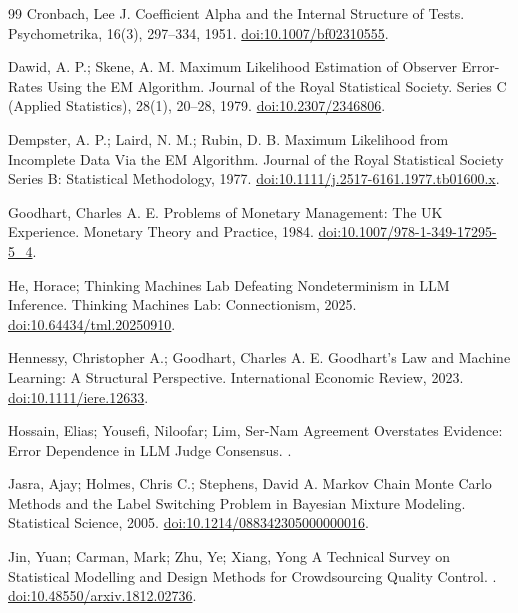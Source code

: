 \begin{thebibliography}{99}
Cronbach, Lee J.
\newblock Coefficient {Alpha} and the Internal Structure of Tests.
\newblock Psychometrika, 16(3), 297--334, 1951. \href{https://doi.org/10.1007/bf02310555}{doi:10.1007/bf02310555}.

Dawid, A. P.; Skene, A. M.
\newblock Maximum Likelihood Estimation of Observer Error-Rates Using the {EM} Algorithm.
\newblock Journal of the Royal Statistical Society. Series C (Applied Statistics), 28(1), 20--28, 1979. \href{https://doi.org/10.2307/2346806}{doi:10.2307/2346806}.

Dempster, A. P.; Laird, N. M.; Rubin, D. B.
\newblock Maximum Likelihood from Incomplete Data Via the {EM} Algorithm.
\newblock Journal of the Royal Statistical Society Series B: Statistical Methodology, 1977. \href{https://doi.org/10.1111/j.2517-6161.1977.tb01600.x}{doi:10.1111/j.2517-6161.1977.tb01600.x}.

Goodhart, Charles A. E.
\newblock Problems of Monetary Management: The {UK} Experience.
\newblock Monetary Theory and Practice, 1984. \href{https://doi.org/10.1007/978-1-349-17295-5\_4}{doi:10.1007/978-1-349-17295-5\_4}.

He, Horace; Thinking Machines Lab
\newblock Defeating Nondeterminism in {LLM} Inference.
\newblock Thinking Machines Lab: Connectionism, 2025. \href{https://doi.org/10.64434/tml.20250910}{doi:10.64434/tml.20250910}.

Hennessy, Christopher A.; Goodhart, Charles A. E.
\newblock Goodhart's Law and Machine Learning: A Structural Perspective.
\newblock International Economic Review, 2023. \href{https://doi.org/10.1111/iere.12633}{doi:10.1111/iere.12633}.

Hossain, Elias; Yousefi, Niloofar; Lim, Ser-Nam
\newblock Agreement Overstates Evidence: Error Dependence in {LLM} Judge Consensus.
.

Jasra, Ajay; Holmes, Chris C.; Stephens, David A.
\newblock Markov Chain Monte Carlo Methods and the Label Switching Problem in Bayesian Mixture Modeling.
\newblock Statistical Science, 2005. \href{https://doi.org/10.1214/088342305000000016}{doi:10.1214/088342305000000016}.

Jin, Yuan; Carman, Mark; Zhu, Ye; Xiang, Yong
\newblock A Technical Survey on Statistical Modelling and Design Methods for Crowdsourcing Quality Control.
. \href{https://doi.org/10.48550/arxiv.1812.02736}{doi:10.48550/arxiv.1812.02736}.


\end{thebibliography}
